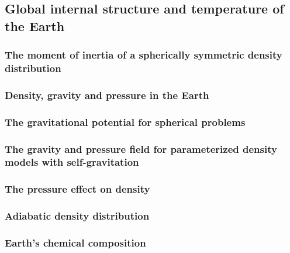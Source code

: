 \documentclass[a4paper]{article}
\begin{document}
\subsection{Global internal structure and temperature of the Earth} %
\subsubsection{The moment of inertia of a spherically symmetric density distribution} %
\label{sect_scalarmomint}  %
\subsubsection{Density, gravity and pressure in the Earth} %
\label{section_Density-gravity-pressure}  %

\subsubsection{The gravitational potential for spherical problems}
  

\subsubsection{The gravity and pressure field for parameterized density models with self-gravitation}
\label{sect_param_densmod}  %
\subsubsection{The pressure effect on density} %
\label{Pressure_density}  %
\subsubsection{Adiabatic density distribution} %
\label{Adiabatic density distribution}  %
\subsubsection{Earth's chemical composition} %
\label{section-chemical-composition}  %
\end{document}
